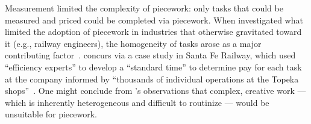 \documentclass[trackingWork]{subfiles}
\begin{document}
Measurement limited the complexity of piecework: only tasks that could be measured and priced could be completed via piecework. 
When \citeauthor{Brown01041990} investigated what limited the adoption of piecework in industries that otherwise gravitated toward it (e.g., railway engineers), the homogeneity of tasks %
arose as a major contributing factor~\cite{Brown01041990}.
\citeauthor{10.2307/23702539} concurs via a case study in Santa Fe Railway, which used ``efficiency experts'' to develop a ``standard time'' to determine pay for each task at the company informed by ``thousands of individual operations at the Topeka shops''~\cite{10.2307/23702539}.
One might conclude from \citeauthor{10.2307/23702539}'s observations that
complex, creative work --- which is inherently heterogeneous and difficult to routinize ---
would be unsuitable for piecework.
\end{document}
